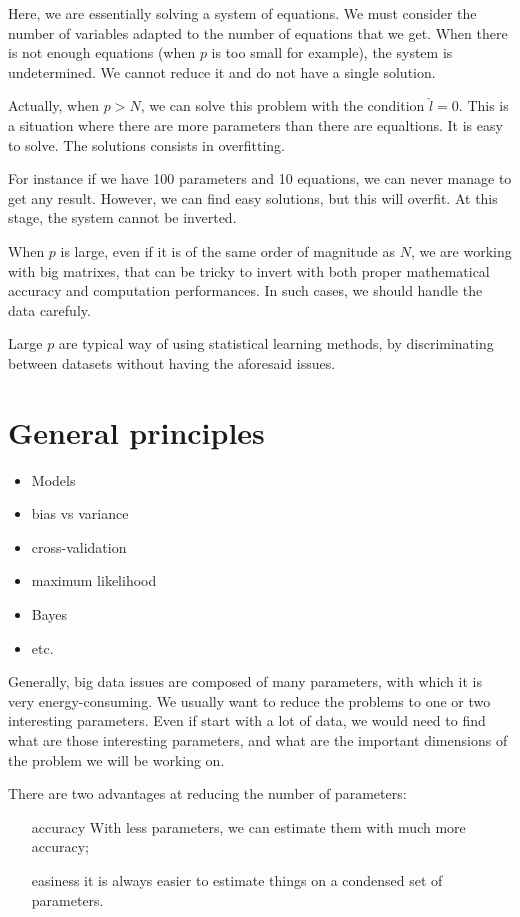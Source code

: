 \documentclass[a4paper]{tufte-book}
\begin{document}
Here, we are essentially solving a system of equations. We must consider the
number of variables adapted to the number of equations that we get. When there is
not enough equations (when $p$ is too small for example), the system is
undetermined. We cannot reduce it and do not have a single solution.

Actually, when $p>N$, we can solve this problem with the condition $\hat{l}=0$.
This is a situation where there are more parameters than there are equaltions. It
is easy to solve. The solutions consists in overfitting.

For instance if we have 100 parameters and 10 equations, we can never manage to
get any result. However, we can find easy solutions, but this will overfit.
At this stage, the system cannot be inverted.

When $p$ is large, even if it is of the same order of magnitude as $N$, we are
working with big matrixes, that can be tricky to invert with both proper
mathematical accuracy and computation performances. In such cases, we should
handle the data carefuly.

Large $p$ are typical way of using statistical learning methods, by
discriminating between datasets without having the aforesaid issues.


\chapter{General principles}
\label{ch:general-principles}

\begin{itemize}
    \item Models
    \item bias vs variance
    \item cross-validation
    \item maximum likelihood
    \item Bayes
    \item etc.
\end{itemize}


Generally, big data issues are composed of many parameters, with which it is
very energy-consuming. We usually want to reduce the problems to one or two
interesting parameters. Even if start with a lot of data, we would need to find
what are those interesting parameters, and what are the important dimensions of
the problem we will be working on.

There are two advantages at reducing the number of parameters:
\begin{itemize}
    \item[accuracy] With less parameters, we can estimate them with much more
        accuracy;
    \item[easiness] it is always easier to estimate things on a condensed set
        of parameters.
\end{itemize}
\end{document}
